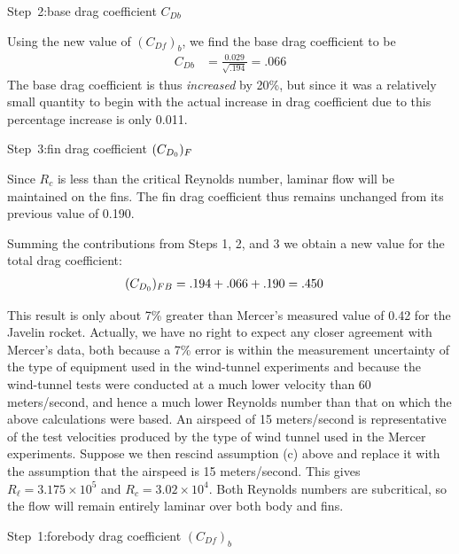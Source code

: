 \medskip\noindent Step~2:\quad base drag coefficient $C_{Db}$

\noindent Using the new value of $(C_{Df})_b$, we find the base drag coefficient to be
\begin{align*}
C_{Db} &= \frac{0.029}{\sqrt{.194}} = .066
\end{align*}
The base drag coefficient is thus \emph{increased} by 20\%, but since it was a relatively small
quantity to begin with the actual increase in drag coefficient due to this percentage increase is
only 0.011.

\medskip\noindent Step~3:\quad fin drag coefficient $(C_{D_0})_F$

\noindent Since $R_c$ is less than the critical Reynolds number, laminar flow will be maintained
on the fins. The fin drag coefficient thus remains unchanged from its previous value of 0.190.

Summing the contributions from Steps 1, 2, and 3 we obtain a new value for the total drag
coefficient:
\begin{align*}
(C_{D_0})_{FB} &= .194 + .066 + .190 = .450
\end{align*}

This result is only about 7\% greater than Mercer's measured value of 0.42 for the Javelin
rocket. Actually, we have no right to expect any closer agreement with Mercer's data, both
because a 7\% error is within the measurement uncertainty of the type of equipment used in the
wind-tunnel experiments and because the wind-tunnel tests were conducted at a much lower velocity
than 60 meters/second, and hence a much lower Reynolds number than that on which the above
calculations were based. An airspeed of 15 meters/second is representative of the test velocities
produced by the type of wind tunnel used in the Mercer experiments. Suppose we then rescind
assumption (c) above and replace it with the assumption that the airspeed is 15 meters/second.
This gives $R_\ell = 3.175 \times 10^{5}$ and $R_c = 3.02 \times 10^{4}$. Both Reynolds numbers
are subcritical, so the flow will remain entirely laminar over both body and fins.

\medskip\noindent Step~1:\quad forebody drag coefficient $(C_{Df})_b$

